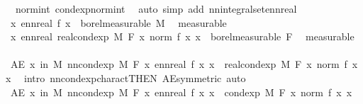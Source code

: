 \begin{isabellebody}
\ {\isacharasterisk}{\kern0pt}{\isacharasterisk}{\kern0pt}\ norm{\isacharunderscore}{\kern0pt}int\ cond{\isacharunderscore}{\kern0pt}exp{\isacharunderscore}{\kern0pt}norm{\isacharunderscore}{\kern0pt}int\ \isamarkupfalse%
\ {\isacharparenleft}{\kern0pt}auto\ simp\ add{\isacharcolon}{\kern0pt}\ nn{\isacharunderscore}{\kern0pt}integral{\isacharunderscore}{\kern0pt}set{\isacharunderscore}{\kern0pt}ennreal{\isacharparenright}{\kern0pt}\isanewline
\ \ \isamarkupfalse%
\ \isamarkupfalse%
\ {\isachardoublequoteopen}{\isacharparenleft}{\kern0pt}{\isasymlambda}x{\isachardot}{\kern0pt}\ ennreal\ {\isasymbar}f\ x{\isasymbar}{\isacharparenright}{\kern0pt}\ {\isasymin}\ borel{\isacharunderscore}{\kern0pt}measurable\ M{\isachardoublequoteclose}\ \isamarkupfalse%
\ measurable\isanewline
\ \ \isamarkupfalse%
\ \isamarkupfalse%
\ {\isachardoublequoteopen}{\isacharparenleft}{\kern0pt}{\isasymlambda}x{\isachardot}{\kern0pt}\ ennreal\ {\isacharparenleft}{\kern0pt}real{\isacharunderscore}{\kern0pt}cond{\isacharunderscore}{\kern0pt}exp\ M\ F\ {\isacharparenleft}{\kern0pt}{\isasymlambda}x{\isachardot}{\kern0pt}\ norm\ {\isacharparenleft}{\kern0pt}f\ x{\isacharparenright}{\kern0pt}{\isacharparenright}{\kern0pt}\ x{\isacharparenright}{\kern0pt}{\isacharparenright}{\kern0pt}\ {\isasymin}\ borel{\isacharunderscore}{\kern0pt}measurable\ F{\isachardoublequoteclose}\ \isamarkupfalse%
\ measurable\isanewline
\ \ \isamarkupfalse%
\ \isamarkupfalse%
\ {\isachardoublequoteopen}AE\ x\ in\ M{\isachardot}{\kern0pt}\ nn{\isacharunderscore}{\kern0pt}cond{\isacharunderscore}{\kern0pt}exp\ M\ F\ {\isacharparenleft}{\kern0pt}{\isasymlambda}x{\isachardot}{\kern0pt}\ ennreal\ {\isasymbar}f\ x{\isasymbar}{\isacharparenright}{\kern0pt}\ x\ {\isacharequal}{\kern0pt}\ real{\isacharunderscore}{\kern0pt}cond{\isacharunderscore}{\kern0pt}exp\ M\ F\ {\isacharparenleft}{\kern0pt}{\isasymlambda}x{\isachardot}{\kern0pt}\ norm\ {\isacharparenleft}{\kern0pt}f\ x{\isacharparenright}{\kern0pt}{\isacharparenright}{\kern0pt}\ x{\isachardoublequoteclose}\ \isamarkupfalse%
\ {\isacharparenleft}{\kern0pt}intro\ nn{\isacharunderscore}{\kern0pt}cond{\isacharunderscore}{\kern0pt}exp{\isacharunderscore}{\kern0pt}charact{\isacharbrackleft}{\kern0pt}THEN\ AE{\isacharunderscore}{\kern0pt}symmetric{\isacharbrackright}{\kern0pt}{\isacharcomma}{\kern0pt}\ auto{\isacharparenright}{\kern0pt}\isanewline
\ \ \isamarkupfalse%
\ {\isachardoublequoteopen}AE\ x\ in\ M{\isachardot}{\kern0pt}\ nn{\isacharunderscore}{\kern0pt}cond{\isacharunderscore}{\kern0pt}exp\ M\ F\ {\isacharparenleft}{\kern0pt}{\isasymlambda}x{\isachardot}{\kern0pt}\ ennreal\ {\isasymbar}f\ x{\isasymbar}{\isacharparenright}{\kern0pt}\ x\ {\isasymle}\ cond{\isacharunderscore}{\kern0pt}exp\ M\ F\ {\isacharparenleft}{\kern0pt}{\isasymlambda}x{\isachardot}{\kern0pt}\ norm\ {\isacharparenleft}{\kern0pt}f\ x{\isacharparenright}{\kern0pt}{\isacharparenright}{\kern0pt}\ x{\isachardoublequoteclose}\ \isamarkupfalse%

\end{isabellebody}
